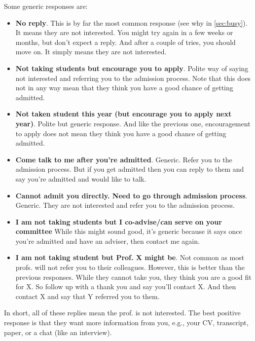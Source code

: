 \documentclass[oneside,11pt,dvipsnames]{book}
\begin{document}
Some generic responses are:
\begin{itemize}
\item \textbf{No reply}. This is by far the most common response (see why in \autoref{sec:busy}).  It means they are not interested.
You might try again in a few weeks or months, but don't expect a reply. And after a couple of tries, you should move on.  It simply means they are not interested.
\item \textbf{Not taking students but encourage you to apply}. Polite way of saying not interested and referring you to the admission process. Note that this does not in any way mean that they think you have a good chance of getting admitted.

\item \textbf{Not taken student this year (but encourage you to apply next year)}. Polite but generic response.  And like the previous one, encouragement to apply does not mean they think you have a good chance of getting admitted.

\item \textbf{Come talk to me after you're admitted}. Generic. Refer you to the admission process. But if you get admitted then you can reply to them and say you're admitted and would like to talk.

\item \textbf{Cannot admit you directly. Need to go through admission process}. Generic. They are not interested and refer you to the admission process.

\item \textbf{I am not taking students but I co-advise/can serve on your committee} While this might sound good, it's generic because it says once you're admitted and have an adviser, then contact me again. 

\item \textbf{I am not taking student but Prof. X might be}. Not common as most profs. will not refer you to their colleagues. However, this is better than the previous responses. While they cannot take you, they think you are a good fit for X. So follow up with a thank you and say you'll contact X.  And then contact X and say that Y referred you to them.
\end{itemize}

In short, all of these replies mean the prof. is not interested.  The best positive response is that they want more information from you, e.g., your CV, transcript, paper, or a chat (like an interview). 
\end{document}

